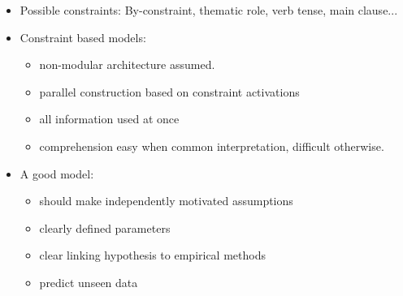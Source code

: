 \documentclass[11pt]{article}
\newenvironment{itemise}{
\begin{itemize}
  \setlength{\itemsep}{1pt}
  \setlength{\parskip}{0pt}
  \setlength{\parsep}{0pt}
}{\end{itemize}}
\begin{document}
\begin{itemise}
\begin{itemise}
\begin{itemise}
 \item 2. Input {\bf determines} the probabilistic activation for each constraint.
 \item 3. {\bf Weigh} constraints according to strength.
 \item 4. Alternatives {\bf compete}.
 \item 5. {\bf Map} cycles to reading time.  
 \end{itemise}
 \item Possible constraints: By-constraint, thematic role, verb tense, main clause...
 \item Constraint based models:
 \begin{itemise}
 \item non-modular architecture assumed.
 \item parallel construction based on constraint activations
 \item all information used at once
 \item comprehension easy when common interpretation, difficult otherwise.
 \end{itemise}
 \item A good model:
 \begin{itemise}
 \item should make independently motivated assumptions
 \item clearly defined parameters
 \item clear linking hypothesis to empirical methods
 \item predict unseen data
 \end{itemise}
\end{itemise}
\end{itemise}

\end{document}
